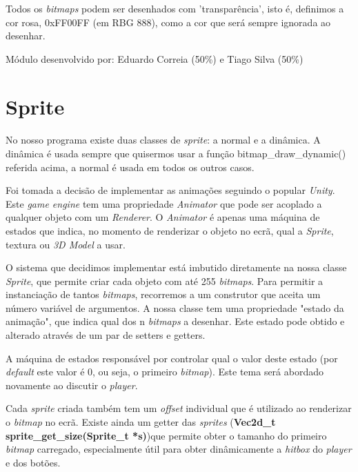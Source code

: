 \documentclass{report}
\begin{document}
Todos os \textit{bitmaps} podem ser desenhados com 'transparência', isto é, definimos a cor rosa, 0xFF00FF (em RBG 888), como a cor que será sempre ignorada ao desenhar. \newline

Módulo desenvolvido por: Eduardo Correia (50\%) e Tiago Silva (50\%)
 
\section{Sprite}

\paragraph{}
No nosso programa existe duas classes de \textit{sprite}: a normal e a dinâmica. A dinâmica é usada sempre que quisermos usar a função bitmap\_draw\_dynamic() referida acima, a normal é usada em todos os outros casos.

Foi tomada a decisão de implementar as animações seguindo o popular \textit{Unity}. Este \textit{game engine} tem uma propriedade \textit{Animator} que pode ser acoplado a qualquer objeto com um \textit{Renderer}. O \textit{Animator} é apenas uma máquina de estados que indica, no momento de renderizar o objeto no ecrã, qual a \textit{Sprite}, textura ou \textit{3D Model} a usar.

O sistema que decidimos implementar está imbutido diretamente na nossa classe \textit{Sprite}, que permite criar cada objeto com até 255 \textit{bitmaps}. Para permitir a instanciação de tantos \textit{bitmaps}, recorremos a um construtor que aceita um número variável de argumentos. A nossa classe tem uma propriedade "estado da animação", que indica qual dos n \textit{bitmaps} a desenhar. Este estado pode obtido e alterado através de um par de setters e getters.

A máquina de estados responsável por controlar qual o valor deste estado (por \textit{default} este valor é 0, ou seja, o primeiro \textit{bitmap}). Este tema será abordado novamente ao discutir o \textit{player}.

Cada \textit{sprite} criada também tem um \textit{offset} individual que é utilizado ao renderizar o \textit{bitmap} no ecrã. Existe ainda um getter das \textit{sprites} (\textbf{Vec2d\_t sprite\_get\_size(Sprite\_t *s)})que permite obter o tamanho do primeiro \textit{bitmap} carregado, especialmente útil para obter dinâmicamente a \textit{hitbox} do \textit{player} e dos botões.\newline
\end{document}
